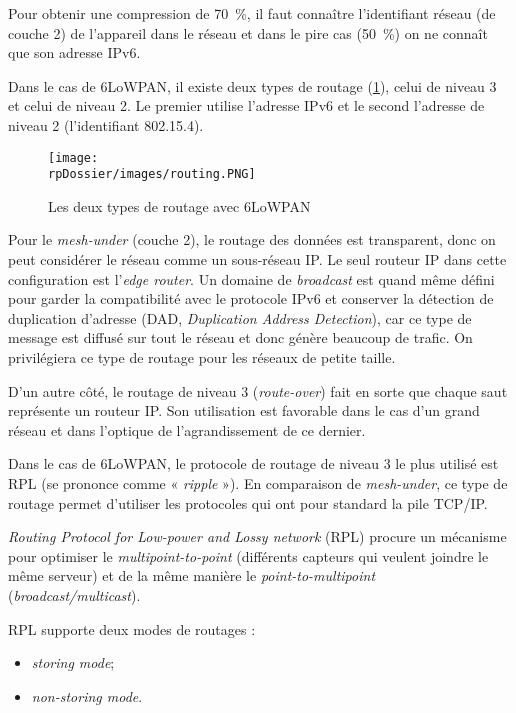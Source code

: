 Pour obtenir une compression de 70~\%, il faut connaître l'identifiant réseau (de couche 2) de l'appareil dans le réseau et dans le pire cas (50~\%) on ne connaît que son adresse IPv6.

Dans le cas de 6LoWPAN, il existe deux types de routage (\cref{routing}), celui de niveau 3 et celui de niveau 2. Le premier utilise l'adresse IPv6 et le second l'adresse de niveau 2 (l'identifiant 802.15.4).

\begin{figure}[H]
\centering
\texttt{[image: \\rpDossier/images/routing.PNG]}
\caption{Les deux types de routage avec 6LoWPAN}
\label{routing}
\end{figure}

Pour le  \textit{mesh-under} (couche 2), le routage des données est transparent, donc on peut considérer le réseau comme un sous-réseau IP. Le seul routeur IP dans cette configuration est l'\textit{edge router}. Un domaine de \textit{broadcast} est quand même défini pour garder la compatibilité avec le protocole IPv6 et conserver la détection de duplication d'adresse (DAD, \textit{Duplication Address Detection}), car ce type de message est diffusé sur tout le réseau et donc génère beaucoup de trafic. On privilégiera ce type de routage pour les réseaux de petite taille.

D'un autre côté, le routage de niveau 3 (\textit{route-over}) fait en sorte que chaque saut représente un routeur IP. Son utilisation est favorable dans le cas d’un grand réseau et dans l'optique de l'agrandissement de ce dernier. 

Dans le cas de 6LoWPAN, le protocole de routage de niveau 3 le plus utilisé est RPL (se prononce comme « \textit{ripple} »). En comparaison de \textit{mesh-under}, ce type de routage permet d'utiliser les protocoles qui ont pour standard la pile TCP/IP.

\textit{Routing Protocol for Low-power and Lossy network} (RPL) procure un mécanisme pour optimiser le \textit{multipoint-to-point} (différents capteurs qui veulent joindre le même serveur) et de la même manière le \textit{point-to-multipoint} (\textit{broadcast/multicast}).

\noindent RPL supporte deux modes de routages : 
\begin{itemize}
	\item \textit{storing mode}; 
	\item \textit{non-storing mode}.
\end{itemize}

